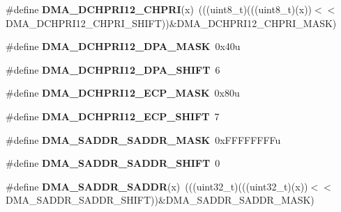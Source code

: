 \begin{DoxyCompactItemize}
\item 
\#define {\bfseries D\+M\+A\+\_\+\+D\+C\+H\+P\+R\+I12\+\_\+\+C\+H\+P\+RI}(x)~(((uint8\+\_\+t)(((uint8\+\_\+t)(x))$<$$<$D\+M\+A\+\_\+\+D\+C\+H\+P\+R\+I12\+\_\+\+C\+H\+P\+R\+I\+\_\+\+S\+H\+I\+FT))\&D\+M\+A\+\_\+\+D\+C\+H\+P\+R\+I12\+\_\+\+C\+H\+P\+R\+I\+\_\+\+M\+A\+SK)\hypertarget{group__DMA__Register__Masks_ga6ecccb191b6a4cd797b6353bba497f4e}{}\label{group__DMA__Register__Masks_ga6ecccb191b6a4cd797b6353bba497f4e}

\item 
\#define {\bfseries D\+M\+A\+\_\+\+D\+C\+H\+P\+R\+I12\+\_\+\+D\+P\+A\+\_\+\+M\+A\+SK}~0x40u\hypertarget{group__DMA__Register__Masks_ga73ff6289479b47b9e3fd209fb447ef3a}{}\label{group__DMA__Register__Masks_ga73ff6289479b47b9e3fd209fb447ef3a}

\item 
\#define {\bfseries D\+M\+A\+\_\+\+D\+C\+H\+P\+R\+I12\+\_\+\+D\+P\+A\+\_\+\+S\+H\+I\+FT}~6\hypertarget{group__DMA__Register__Masks_ga2542343fffad88b0445eaa1d2db1e56f}{}\label{group__DMA__Register__Masks_ga2542343fffad88b0445eaa1d2db1e56f}

\item 
\#define {\bfseries D\+M\+A\+\_\+\+D\+C\+H\+P\+R\+I12\+\_\+\+E\+C\+P\+\_\+\+M\+A\+SK}~0x80u\hypertarget{group__DMA__Register__Masks_ga6670cd9c6c3dba8c53f330f44c6ca328}{}\label{group__DMA__Register__Masks_ga6670cd9c6c3dba8c53f330f44c6ca328}

\item 
\#define {\bfseries D\+M\+A\+\_\+\+D\+C\+H\+P\+R\+I12\+\_\+\+E\+C\+P\+\_\+\+S\+H\+I\+FT}~7\hypertarget{group__DMA__Register__Masks_ga5331565714ddd597bad4518d1c5317e4}{}\label{group__DMA__Register__Masks_ga5331565714ddd597bad4518d1c5317e4}

\item 
\#define {\bfseries D\+M\+A\+\_\+\+S\+A\+D\+D\+R\+\_\+\+S\+A\+D\+D\+R\+\_\+\+M\+A\+SK}~0x\+F\+F\+F\+F\+F\+F\+F\+Fu\hypertarget{group__DMA__Register__Masks_ga3dbf7c2ee61861c859e0cb3a420a77f8}{}\label{group__DMA__Register__Masks_ga3dbf7c2ee61861c859e0cb3a420a77f8}

\item 
\#define {\bfseries D\+M\+A\+\_\+\+S\+A\+D\+D\+R\+\_\+\+S\+A\+D\+D\+R\+\_\+\+S\+H\+I\+FT}~0\hypertarget{group__DMA__Register__Masks_ga02af13fd09f7b39e0fbbbb8e28ddcf4d}{}\label{group__DMA__Register__Masks_ga02af13fd09f7b39e0fbbbb8e28ddcf4d}

\item 
\#define {\bfseries D\+M\+A\+\_\+\+S\+A\+D\+D\+R\+\_\+\+S\+A\+D\+DR}(x)~(((uint32\+\_\+t)(((uint32\+\_\+t)(x))$<$$<$D\+M\+A\+\_\+\+S\+A\+D\+D\+R\+\_\+\+S\+A\+D\+D\+R\+\_\+\+S\+H\+I\+FT))\&D\+M\+A\+\_\+\+S\+A\+D\+D\+R\+\_\+\+S\+A\+D\+D\+R\+\_\+\+M\+A\+SK)\hypertarget{group__DMA__Register__Masks_gaed2c0dfa4b40da7d754af68651980303}{}\label{group__DMA__Register__Masks_gaed2c0dfa4b40da7d754af68651980303}


\end{DoxyCompactItemize}
